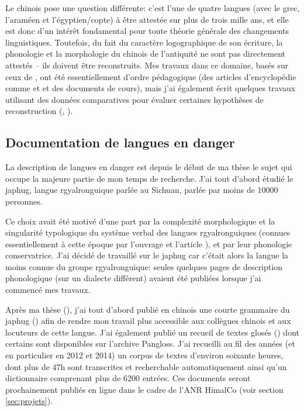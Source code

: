 \documentclass[oldfontcommands,oneside,a4paper,11pt]{article}
\begin{document}
Le chinois pose une question différente: c'est l'une de quatre langues (avec le grec, l'araméen et l'égyptien/copte) à être attestée sur plus de trois mille ans, et elle est donc d'un intérêt  fondamental pour toute théorie générale des changements linguistiques. Toutefois, du fait du caractère  logographique de son écriture, la phonologie et la morphologie du chinois de l'antiquité ne sont pas directement attestés -- ils doivent être reconstruits. Mes travaux dans ce domaine, basés sur ceux de \citet{sagart99roc}, ont été essentiellement d'ordre pédagogique (des articles d'encyclopédie comme \citealt{jacques2015traditional} et  \citealt{jacques2015genetic} et des documents de cours), mais j'ai également écrit quelques travaux utilisant des données comparatives pour évaluer certaines hypothèses de reconstruction (\citealt{jacques00ywij}, \citealt{jacques05}).

\subsection{Documentation de langues en danger} \label{sec:documentation}
 
La description de langues en danger est depuis le début de ma thèse le sujet qui occupe la majeure partie de mon temps de recherche.  J'ai tout d'abord étudié le japhug, langue rgyalronguique parlée au Sichuan, parlée par moins de 10000 personnes.

Ce choix avait été motivé d'une part par la complexité morphologique et la singularité typologique du système verbal des langues rgyalronguiques (connues essentiellement à cette époque par l'ouvrage \citealt{linxr93jiarong} et l'article \citealt{jackson00sidaba}), et par leur phonologie conservatrice. J'ai décidé de travaillé sur le japhug car c'était alors la langue la moins connue du groupe rgyalronguique:  seules quelques pages de description phonologique (sur un dialecte différent) avaient été publiées lorsque j'ai commencé mes travaux.

Après ma thèse (\citealt{jacques04these}), j'ai tout d'abord publié en chinois une courte grammaire du japhug (\citealt{jacques08}) afin de rendre mon travail plus accessible aux collègues chinois et aux locuteurs de cette langue. J'ai également publié un recueil de textes glosés (\citealt{jacques10gesar}) dont certains sont disponibles sur l'archive Pangloss. J'ai recueilli au fil des années (et en particulier en 2012 et 2014) un corpus de textes d'environ soixante heures, dont plus de 47h sont transcrites et recherchable automatiquement ainsi qu'un dictionnaire comprenant plus de 6200 entrées. Ces documents seront prochainement publiés en ligne dans le cadre de l'ANR HimalCo (voir section  \ref{sec:projets}).
\end{document}
